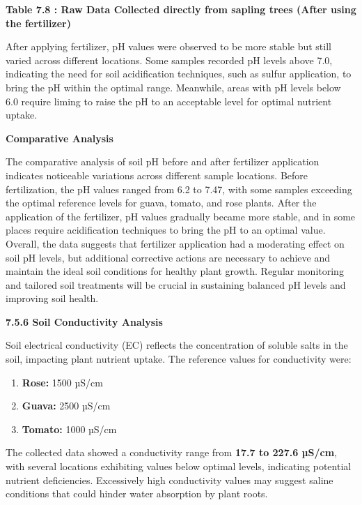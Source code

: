 \documentclass{book} %
\begin{document}
\textbf{Table 7.8 : Raw Data Collected directly from sapling trees (After using the fertilizer)}

\noindent After applying fertilizer, pH values were observed to be more stable but still varied across different locations. Some samples recorded pH levels above 7.0, indicating the need for soil acidification techniques, such as sulfur application, to bring the pH within the optimal range. Meanwhile, areas with pH levels below 6.0 require liming to raise the pH to an acceptable level for optimal nutrient uptake.

\noindent \textbf{Comparative Analysis}

\noindent The comparative analysis of soil pH before and after fertilizer application indicates noticeable variations across different sample locations.  Before fertilization, the pH values ranged from 6.2 to 7.47, with some samples exceeding the optimal reference levels for guava, tomato, and rose plants. After the application of the fertilizer, pH values gradually became more stable, and in some places  require acidification techniques to bring the pH to an optimal value. Overall, the data suggests that fertilizer application had a moderating effect on soil pH levels, but additional corrective actions are necessary to achieve and maintain the ideal soil conditions for healthy plant growth. Regular monitoring and tailored soil treatments will be crucial in sustaining balanced pH levels and improving soil health.

\noindent 

\noindent \textbf{7.5.6 Soil Conductivity Analysis}

\noindent Soil electrical conductivity (EC) reflects the concentration of soluble salts in the soil, impacting plant nutrient uptake. The reference values for conductivity were:

\begin{enumerate}
\item  \textbf{Rose:} 1500 µS/cm

\item  \textbf{Guava:} 2500 µS/cm

\item  \textbf{Tomato:} 1000 µS/cm
\end{enumerate}

\noindent The collected data showed a conductivity range from \textbf{17.7 to 227.6 µS/cm}, with several locations exhibiting values below optimal levels, indicating potential nutrient deficiencies. Excessively high conductivity values may suggest saline conditions that could hinder water absorption by plant roots.\textbf{}
\end{document}
